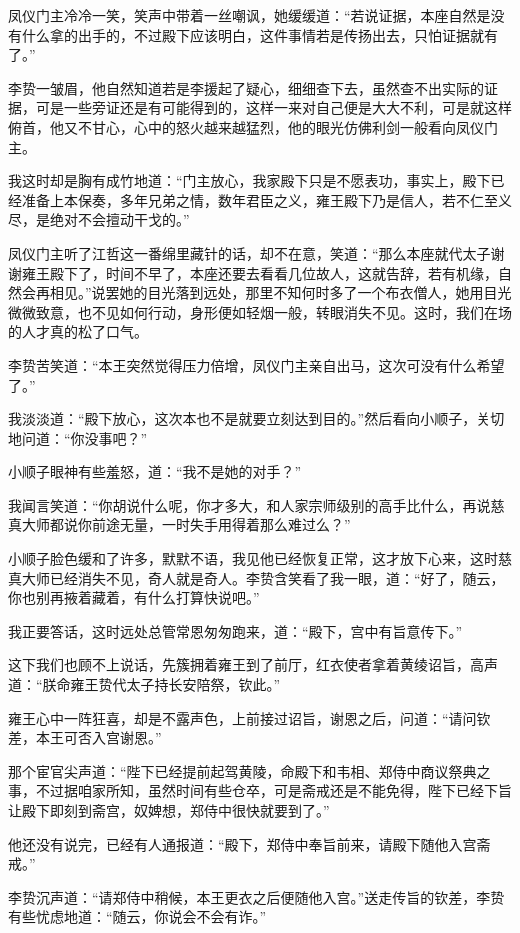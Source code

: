 凤仪门主冷冷一笑，笑声中带着一丝嘲讽，她缓缓道：“若说证据，本座自然是没有什么拿的出手的，不过殿下应该明白，这件事情若是传扬出去，只怕证据就有了。”

李贽一皱眉，他自然知道若是李援起了疑心，细细查下去，虽然查不出实际的证据，可是一些旁证还是有可能得到的，这样一来对自己便是大大不利，可是就这样俯首，他又不甘心，心中的怒火越来越猛烈，他的眼光仿佛利剑一般看向凤仪门主。

我这时却是胸有成竹地道：“门主放心，我家殿下只是不愿表功，事实上，殿下已经准备上本保奏，多年兄弟之情，数年君臣之义，雍王殿下乃是信人，若不仁至义尽，是绝对不会擅动干戈的。”

凤仪门主听了江哲这一番绵里藏针的话，却不在意，笑道：“那么本座就代太子谢谢雍王殿下了，时间不早了，本座还要去看看几位故人，这就告辞，若有机缘，自然会再相见。”说罢她的目光落到远处，那里不知何时多了一个布衣僧人，她用目光微微致意，也不见如何行动，身形便如轻烟一般，转眼消失不见。这时，我们在场的人才真的松了口气。

李贽苦笑道：“本王突然觉得压力倍增，凤仪门主亲自出马，这次可没有什么希望了。”

我淡淡道：“殿下放心，这次本也不是就要立刻达到目的。”然后看向小顺子，关切地问道：“你没事吧？”

小顺子眼神有些羞怒，道：“我不是她的对手？”

我闻言笑道：“你胡说什么呢，你才多大，和人家宗师级别的高手比什么，再说慈真大师都说你前途无量，一时失手用得着那么难过么？”

小顺子脸色缓和了许多，默默不语，我见他已经恢复正常，这才放下心来，这时慈真大师已经消失不见，奇人就是奇人。李贽含笑看了我一眼，道：“好了，随云，你也别再掖着藏着，有什么打算快说吧。”

我正要答话，这时远处总管常恩匆匆跑来，道：“殿下，宫中有旨意传下。”

这下我们也顾不上说话，先簇拥着雍王到了前厅，红衣使者拿着黄绫诏旨，高声道：“朕命雍王贽代太子持长安陪祭，钦此。”

雍王心中一阵狂喜，却是不露声色，上前接过诏旨，谢恩之后，问道：“请问钦差，本王可否入宫谢恩。”

那个宦官尖声道：“陛下已经提前起驾黄陵，命殿下和韦相、郑侍中商议祭典之事，不过据咱家所知，虽然时间有些仓卒，可是斋戒还是不能免得，陛下已经下旨让殿下即刻到斋宫，奴婢想，郑侍中很快就要到了。”

他还没有说完，已经有人通报道：“殿下，郑侍中奉旨前来，请殿下随他入宫斋戒。”

李贽沉声道：“请郑侍中稍候，本王更衣之后便随他入宫。”送走传旨的钦差，李贽有些忧虑地道：“随云，你说会不会有诈。”

